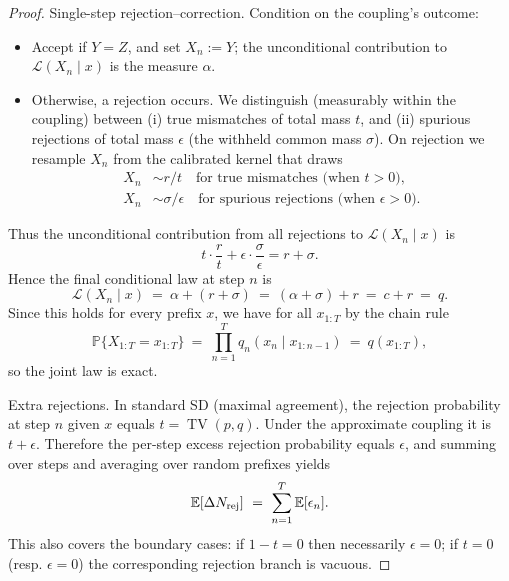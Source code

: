 \begin{proof}
Single-step rejection--correction. Condition on the coupling's outcome:
\begin{itemize}
  \item Accept if $Y=Z$, and set $X_n:=Y$; the unconditional contribution to $\mathcal L(X_n\mid x)$ is the measure $\alpha$.
  \item Otherwise, a rejection occurs. We distinguish (measurably within the coupling) between (i) true mismatches of total mass $t$, and (ii) spurious rejections of total mass $\epsilon$ (the withheld common mass $\sigma$). On rejection we resample $X_n$ from the calibrated kernel that draws
  \[
  \begin{aligned}
  X_n &\sim r/t \quad \text{for true mismatches (when } t>0 \text{)},\\
  X_n &\sim \sigma/\epsilon \quad \text{for spurious rejections (when } \epsilon>0 \text{)}.
  \end{aligned}
  \]
\end{itemize}
Thus the unconditional contribution from all rejections to $\mathcal L(X_n\mid x)$ is
\[
 t\cdot \frac{r}{t} + \epsilon\cdot \frac{\sigma}{\epsilon} = r+\sigma.
\]
Hence the final conditional law at step $n$ is
\[
\mathcal L(X_n\mid x)\ =\ \alpha + (r+\sigma)\ =\ (\alpha+\sigma)+r\ =\ c+r\ =\ q.
\]
Since this holds for every prefix $x$, we have for all $x_{1:T}$ by the chain rule
\[
\mathbb P\{X_{1:T}=x_{1:T}\}\ =\ \prod_{n=1}^T q_n(x_n\mid x_{1:n-1})\ =\ q(x_{1:T}),
\]
so the joint law is exact.

Extra rejections. In standard SD (maximal agreement), the rejection probability at step $n$ given $x$ equals $t=\operatorname{TV}(p,q)$. Under the approximate coupling it is $t+\epsilon$. Therefore the per-step excess rejection probability equals $\epsilon$, and summing over steps and averaging over random prefixes yields
\[
\mathbb E[\Delta N_{\mathrm{rej}}]\ =\ \sum_{n=1}^T \mathbb E[\epsilon_n].\qedhere
\]
This also covers the boundary cases: if $1-t=0$ then necessarily $\epsilon=0$; if $t=0$ (resp. $\epsilon=0$) the corresponding rejection branch is vacuous.
\end{proof}

